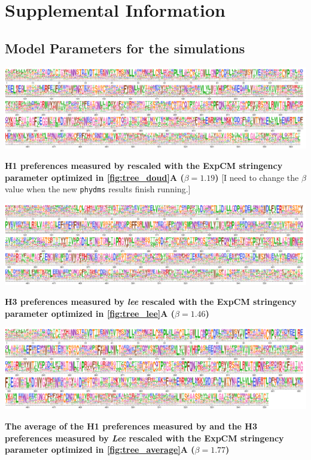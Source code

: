 \documentclass[11pt]{article}
\newcommand\skhcomment[1]{{\color{cyan}[#1]}}
\begin{document}
\newpage
\section*{Supplemental Information}

\subsection*{Model Parameters for the simulations}

\begin{suppfig}[H]
\centerline{\includegraphics[width=\textwidth]{figures/prefs_doud}}
\caption{\label{suppfig:prefs_doud}
\textbf{H1 preferences measured by \cite{doud2016accurate} rescaled with the ExpCM stringency parameter optimized in \ref{fig:tree_doud}A  ($\beta = 1.19$)} 
\skhcomment{I need to change the $\beta$ value when the new \texttt{phydms} results finish running.}
}
\end{suppfig}

\begin{suppfig}[H]
\centerline{\includegraphics[width=\textwidth]{figures/prefs_lee}}
\caption{\label{suppfig:prefs_lee}
\textbf{H3 preferences measured by \textit{lee} rescaled with the ExpCM stringency parameter optimized in \ref{fig:tree_lee}A  ($\beta = 1.46$)}
 }
\end{suppfig}

\begin{suppfig}[H]
\centerline{\includegraphics[width=\textwidth]{figures/prefs_average}}
\caption{\label{suppfig:prefs_average}
\textbf{The average of the H1 preferences measured by \cite{doud2016accurate} and the H3 preferences measured by \textit{Lee} rescaled with the ExpCM stringency parameter optimized in \ref{fig:tree_average}A  ($\beta = 1.77$)}}
\end{suppfig}
 
\end{document}

